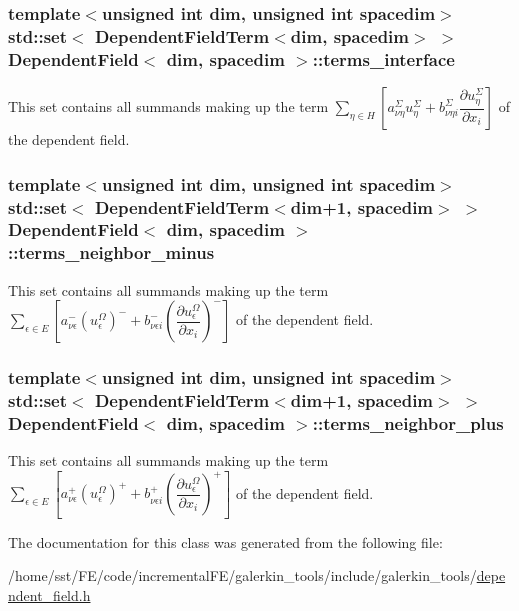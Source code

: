 \subsubsection[{\texorpdfstring{terms\+\_\+interface}{terms_interface}}]{\setlength{\rightskip}{0pt plus 5cm}template$<$unsigned int dim, unsigned int spacedim$>$ std\+::set$<$ {\bf Dependent\+Field\+Term}$<$dim, spacedim$>$ $>$ {\bf Dependent\+Field}$<$ dim, spacedim $>$\+::terms\+\_\+interface\hspace{0.3cm}{\ttfamily [private]}}\hypertarget{class_dependent_field_aa6326d64fd7828c935946136ec5ec122}{}\label{class_dependent_field_aa6326d64fd7828c935946136ec5ec122}
This set contains all summands making up the term $\sum_{\eta \in H} \left[ a^\Sigma_{\nu\eta} u^\Sigma_\eta + b^\Sigma_{\nu\eta i} \dfrac{\partial u^\Sigma_\eta}{\partial x_i} \right]$ of the dependent field. 
\subsubsection[{\texorpdfstring{terms\+\_\+neighbor\+\_\+minus}{terms_neighbor_minus}}]{\setlength{\rightskip}{0pt plus 5cm}template$<$unsigned int dim, unsigned int spacedim$>$ std\+::set$<$ {\bf Dependent\+Field\+Term}$<$dim+1, spacedim$>$ $>$ {\bf Dependent\+Field}$<$ dim, spacedim $>$\+::terms\+\_\+neighbor\+\_\+minus\hspace{0.3cm}{\ttfamily [private]}}\hypertarget{class_dependent_field_a9ac1d390137d52ef6c58b230d540ce38}{}\label{class_dependent_field_a9ac1d390137d52ef6c58b230d540ce38}
This set contains all summands making up the term $\sum_{\epsilon \in E} \left[ a^-_{\nu\epsilon} (u^\Omega_\epsilon)^- + b^-_{\nu\epsilon i} \left(\dfrac{\partial u^\Omega_\epsilon}{\partial x_i}\right)^- \right]$ of the dependent field. 
\subsubsection[{\texorpdfstring{terms\+\_\+neighbor\+\_\+plus}{terms_neighbor_plus}}]{\setlength{\rightskip}{0pt plus 5cm}template$<$unsigned int dim, unsigned int spacedim$>$ std\+::set$<$ {\bf Dependent\+Field\+Term}$<$dim+1, spacedim$>$ $>$ {\bf Dependent\+Field}$<$ dim, spacedim $>$\+::terms\+\_\+neighbor\+\_\+plus\hspace{0.3cm}{\ttfamily [private]}}\hypertarget{class_dependent_field_a05ba04a9f0f50fd881055f3abf46c9f5}{}\label{class_dependent_field_a05ba04a9f0f50fd881055f3abf46c9f5}
This set contains all summands making up the term $\sum_{\epsilon \in E} \left[ a^+_{\nu\epsilon} (u^\Omega_\epsilon)^+ + b^+_{\nu\epsilon i} \left(\dfrac{\partial u^\Omega_\epsilon}{\partial x_i}\right)^+ \right]$ of the dependent field. 

The documentation for this class was generated from the following file\+:\begin{DoxyCompactItemize}
\item 
/home/sst/\+F\+E/code/incremental\+F\+E/galerkin\+\_\+tools/include/galerkin\+\_\+tools/\hyperlink{dependent__field_8h}{dependent\+\_\+field.\+h}\end{DoxyCompactItemize}
